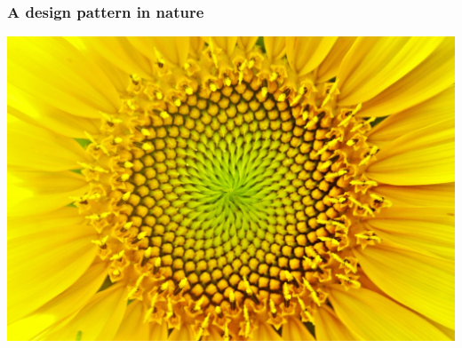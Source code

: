 \documentclass[12pt,compress,english,utf8,t]{beamer}
\begin{document}
\begin{frame}\frametitle{A design pattern in nature}
  \begin{center}
    \includegraphics[height=0.6\textheight]{sonnenblume2}
    \bigskip


\end{center}
\end{frame}
\end{document}
